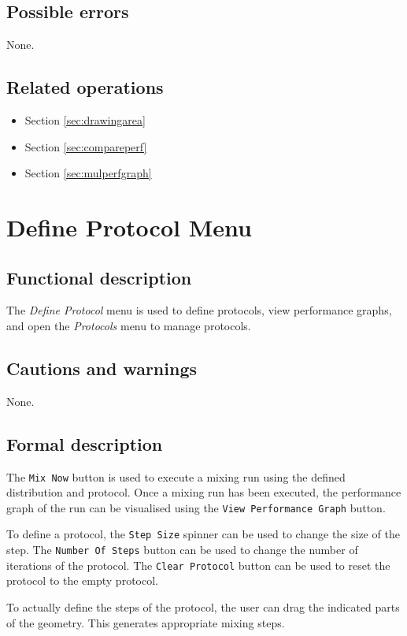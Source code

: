   \subsection*{Possible errors}
  None.
  
  \subsection*{Related operations}
  \begin{itemize}
    \item Section \ref{sec:drawingarea}
    \item Section \ref{sec:compareperf}
    \item Section \ref{sec:mulperfgraph}
  \end{itemize}

\section{Define Protocol Menu}\label{sec:defprot}
  \subsection*{Functional description}
  The \emph{Define Protocol} menu is used to define protocols, view performance graphs, and open the \emph{Protocols} menu to manage protocols.

  \subsection*{Cautions and warnings}
  None.

  \subsection*{Formal description}
  The \texttt{Mix Now} button is used to execute a mixing run using the defined distribution and protocol. Once a mixing run has been executed, the performance graph of the run can be visualised using the \texttt{View Performance Graph} button.
  
  To define a protocol, the \texttt{Step Size} spinner can be used to change the size of the step. The \texttt{Number Of Steps} button can be used to change the number of iterations of the protocol. The \texttt{Clear Protocol} button can be used to reset the protocol to the empty protocol.
  
  To actually define the steps of the protocol, the user can drag the indicated parts of the geometry. This generates appropriate mixing steps.
  
